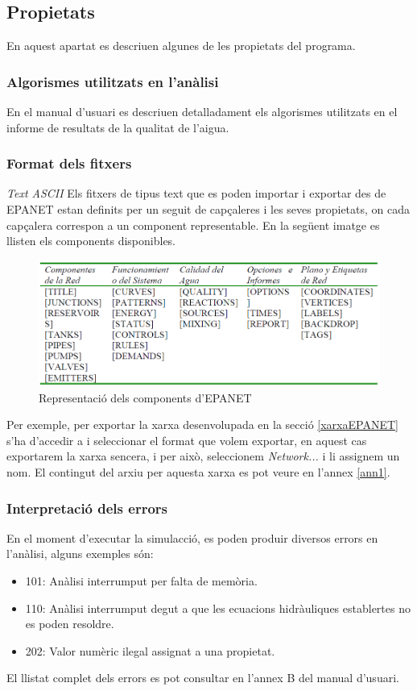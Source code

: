 \documentclass[12pt]{article}
\begin{document}
\subsection{Propietats}
En aquest apartat es descriuen algunes de les propietats del programa.

\subsubsection{Algorismes utilitzats en l'anàlisi}
En el manual d'usuari\cite{DocuEpanet} es descriuen detalladament els algorismes utilitzats en el informe de resultats de la qualitat de l'aigua.

\subsubsection{Format dels fitxers}
\textit{Text ASCII}
Els fitxers de tipus text que es poden importar i exportar des de EPANET estan definits per un seguit de capçaleres i les seves propietats, on cada capçalera correspon a un component representable. En la següent imatge es llisten els components disponibles.
\begin{figure}[h!]
	\centering
	\includegraphics[scale=.5]{imatges/epanet/components.png}
	\caption{Representació dels components d'EPANET}
\end{figure}
Per exemple, per exportar la xarxa desenvolupada en la secció \ref{xarxaEPANET} s'ha d'accedir a  i seleccionar el format que volem exportar, en aquest cas exportarem la xarxa sencera, i per això, seleccionem \textit{Network...} i li assignem un nom. El contingut del arxiu per aquesta xarxa es pot veure en l'annex \ref{ann1}.

\subsubsection{Interpretació dels errors}
En el moment d'executar la simulacció, es poden produir diversos errors en l'anàlisi, alguns exemples són:
\begin{itemize}
	\item 101: Anàlisi interrumput per falta de memòria.
	\item 110: Anàlisi interrumput degut a que les ecuacions hidràuliques establertes no es poden resoldre.
	\item 202: Valor numèric ilegal assignat a una propietat.
\end{itemize}
El llistat complet dels errors es pot consultar en l'annex B del manual d'usuari\cite{DocuEpanet}.
\end{document}
